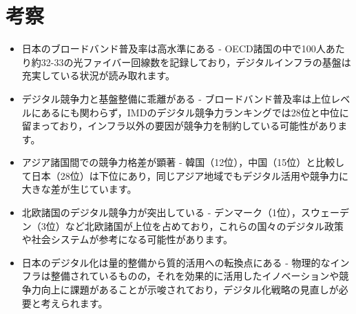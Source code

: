 \documentclass[a4paper,11pt,dvipdfmx]{ujarticle}
\begin{document}
\section{考察}
\begin{itemize}
    \item 日本のブロードバンド普及率は高水準にある - OECD諸国の中で100人あたり約32-33の光ファイバー回線数を記録しており，デジタルインフラの基盤は充実している状況が読み取れます。
    \item デジタル競争力と基盤整備に乖離がある - ブロードバンド普及率は上位レベルにあるにも関わらず，IMDのデジタル競争力ランキングでは28位と中位に留まっており，インフラ以外の要因が競争力を制約している可能性があります。
    \item アジア諸国間での競争力格差が顕著 - 韓国（12位），中国（15位）と比較して日本（28位）は下位にあり，同じアジア地域でもデジタル活用や競争力に大きな差が生じています。
    \item 北欧諸国のデジタル競争力が突出している - デンマーク（1位），スウェーデン（3位）など北欧諸国が上位を占めており，これらの国々のデジタル政策や社会システムが参考になる可能性があります。
    \item 日本のデジタル化は量的整備から質的活用への転換点にある - 物理的なインフラは整備されているものの，それを効果的に活用したイノベーションや競争力向上に課題があることが示唆されており，デジタル化戦略の見直しが必要と考えられます。
\end{itemize}



%



\end{document}
